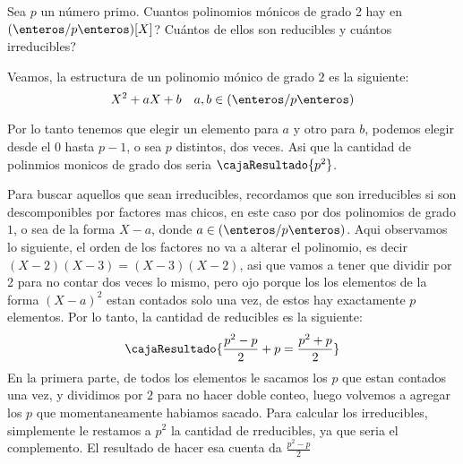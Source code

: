 \begin{enunciado}{\ejercicio}
Sea $p$ un número primo. Cuantos polinomios mónicos de grado 2 hay en $(\enteros/p\enteros)[X]$? Cuántos de ellos
son reducibles y cuántos irreducibles?
\end{enunciado}

Veamos, la estructura de un polinomio mónico de grado $2$ es la siguiente:
$$
X^2 + aX + b \quad a, b \in (\enteros/p\enteros)
$$

Por lo tanto tenemos que elegir un elemento para $a$ y otro para $b$, podemos elegir desde el $0$ hasta $p-1$, o sea 
$p$ distintos, dos veces. Asi que la cantidad de polinmios monicos de grado dos seria $\cajaResultado{p^2}$. 

Para buscar aquellos que sean irreducibles, recordamos que son irreducibles si son descomponibles por factores mas chicos, en este 
caso por dos polinomios de grado $1$, o sea de la forma $X - a$, donde $a \in (\enteros/p\enteros)$. Aqui observamos lo siguiente, 
el orden de los factores no va a alterar el polinomio, es decir $(X-2)(X-3) = (X-3)(X-2)$, asi que vamos a tener que dividir por 2 para no contar dos veces lo mismo, 
pero ojo porque los los elementos de la forma $(X-a)^2$ estan contados solo una vez, de estos hay exactamente $p$ elementos. 
Por lo tanto, la cantidad de reducibles es la siguiente:
$$
\cajaResultado{\frac{p^2 - p}{2} + p = \frac{p^2 + p}{2}} 
$$
En la primera parte, de todos los elementos le sacamos los $p$ que estan contados una vez, y dividimos por $2$ para 
no hacer doble conteo, luego volvemos a agregar los $p$ que momentaneamente habiamos sacado.
Para calcular los irreducibles, simplemente le restamos a $p^2$ la cantidad de rreducibles, ya que seria el complemento. 
El resultado de hacer esa cuenta da $\frac{p^2 - p}{2}$

\begin{aportes}
 \item {}
\end{aportes}
